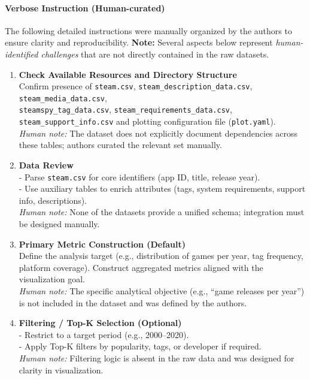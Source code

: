 \documentclass[11pt, a4paper, logo, copyright]{googlecloud}
\begin{document}
\paragraph{Verbose Instruction (Human-curated)}

The following detailed instructions were manually organized by the authors to ensure clarity and reproducibility. 
\textbf{Note:} Several aspects below represent \emph{human-identified challenges} that are not directly contained in the raw datasets.

\begin{enumerate}[itemsep=0pt, parsep=0pt, topsep=0pt, leftmargin=2em]
    \item \textbf{Check Available Resources and Directory Structure} \\
    Confirm presence of \texttt{steam.csv}, \texttt{steam\_description\_data.csv}, \texttt{steam\_media\_data.csv}, \\
    \texttt{steamspy\_tag\_data.csv}, \texttt{steam\_requirements\_data.csv},  \texttt{steam\_support\_info.csv} and plotting configuration file (\texttt{plot.yaml}). \\
    \emph{Human note:} The dataset does not explicitly document dependencies across these tables; authors curated the relevant set manually.

    \item \textbf{Data Review} \\
    - Parse \texttt{steam.csv} for core identifiers (app ID, title, release year). \\
    - Use auxiliary tables to enrich attributes (tags, system requirements, support info, descriptions). \\
    \emph{Human note:} None of the datasets provide a unified schema; integration must be designed manually.

    \item \textbf{Primary Metric Construction (Default)} \\
    Define the analysis target (e.g., distribution of games per year, tag frequency, platform coverage). Construct aggregated metrics aligned with the visualization goal. \\
    \emph{Human note:} The specific analytical objective (e.g., ``game releases per year'') is not included in the dataset and was defined by the authors.

    \item \textbf{Filtering / Top-K Selection (Optional)} \\
    - Restrict to a target period (e.g., 2000--2020). \\
    - Apply Top-K filters by popularity, tags, or developer if required. \\
    \emph{Human note:} Filtering logic is absent in the raw data and was designed for clarity in visualization.


\end{enumerate}
\end{document}
